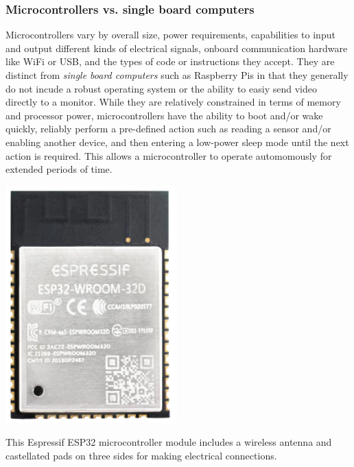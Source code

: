 \subsubsection{Microcontrollers vs. single board computers}

Microcontrollers vary by overall size, power requirements, capabilities to input and output different kinds of electrical signals, onboard communication hardware like WiFi or USB, and the types of code or instructions they accept.
They are distinct from \emph{single board computers} such as Raspberry Pis in that they generally do not incude a robust operating system or the ability to easiy send video directly to a monitor.
While they are relatively constrained in terms of memory and processor power, microcontrollers have the ability to boot and/or wake quickly, reliably perform a pre-defined action such as reading a sensor and/or enabling another device, and then entering a low-power sleep mode until the next action is required. 
This allows a microcontroller to operate automomously for extended periods of time. 


\begin{marginfigure}[-12cm]
	\begin{center}
		\includegraphics[width=\MFW]{Images/ESP32.png}
		\caption[ESP32 Microcontroller]{This Espressif ESP32 microcontroller module includes a wireless antenna and castellated pads on three sides for making electrical connections.}
	\end{center}
\end{marginfigure}

